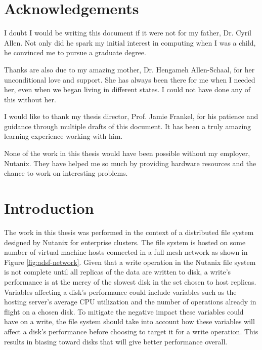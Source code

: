 \documentclass[12pt]{article}
\begin{document}
\section*{Acknowledgements}
\thispagestyle{empty}

I doubt I would be writing this document if it were not for my father, Dr.
Cyril Allen. Not only did he spark my initial interest in computing when I was
a child, he convinced me to pursue a graduate degree.

Thanks are also due to my amazing mother, Dr. Hengameh Allen-Schaal, for her
unconditional love and support. She has always been there for me when I needed
her, even when we began living in different states. I could not have done any
of this without her.

I would like to thank my thesis director, Prof. Jamie Frankel, for
his patience and guidance through multiple drafts of this document. It has been
a truly amazing learning experience working with him. 

None of the work in this thesis would have been possible without my employer,
Nutanix. They have helped me so much by providing hardware resources and
the chance to work on interesting problems.

\clearpage
\newpage


\tableofcontents
\newpage

\listoffigures
\newpage

\listoftables
\newpage


\newpage
\FloatBarrier
\section{Introduction}

  The work in this thesis was performed in the context of a distributed file
  system designed by Nutanix for enterprise clusters. The file system is hosted
  on some number of virtual machine hosts connected in a full mesh network as
  shown in Figure \ref{fig:adsf-network}. Given that a write operation in the
  Nutanix file system is not complete until all replicas of the data are
  written to disk, a write's performance is at the mercy of the slowest disk in
  the set chosen to host replicas. Variables affecting a disk's performance
  could include variables such as the hosting server's average CPU utilization
  and the number of operations already in flight on a chosen disk.  To mitigate
  the negative impact these variables could have on a write, the file system
  should take into account how these variables will affect a disk's performance
  before choosing to target it for a write operation. This results in biasing
  toward disks that will give better performance overall.
\end{document}
